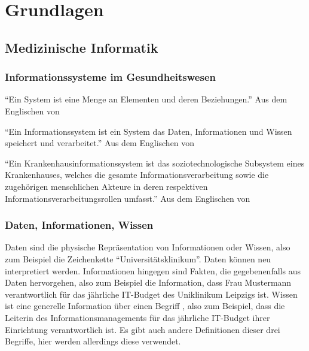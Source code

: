 \chapter{Grundlagen}\label{ch:preliminaries}

\section{Medizinische Informatik}

\subsection{Informationssysteme im Gesundheitswesen}

\begin{definition}[System]
\enquote{Ein System ist eine Menge an Elementen und deren Beziehungen.}
Aus dem Englischen von \citet[S.~30]{bb}
\end{definition}
\begin{definition}[Informationssystem]
\enquote{Ein Informationssystem ist ein System das Daten, Informationen und Wissen speichert und verarbeitet.}
Aus dem Englischen von \citet[S.~30]{bb}
\end{definition}

\begin{definition}
\enquote{Ein Krankenhausinformationssystem ist das soziotechnologische Subsystem eines Krankenhauses, welches die gesamte Informationsverarbeitung sowie die zugehörigen menschlichen Akteure in deren respektiven Informationsverarbeitungsrollen umfasst.}
Aus dem Englischen von \citet[S.~37]{bb}
\end{definition}

\subsection{Daten, Informationen, Wissen}
Daten sind die physische Repräsentation von Informationen oder Wissen, also zum Beispiel die Zeichenkette \enquote{Universitätsklinikum}.
Daten können neu interpretiert werden.
Informationen hingegen sind Fakten, die gegebenenfalls aus Daten hervorgehen, also zum Beispiel die Information, dass Frau Mustermann verantwortlich für das jährliche IT-Budget des Uniklinikum Leipzigs ist.
Wissen ist eine generelle Information über einen Begriff \citep[S.~29]{bb}, also zum Beispiel, dass die Leiterin des Informationsmanagements für das jährliche IT-Budget ihrer Einrichtung verantwortlich ist.
Es gibt auch andere Definitionen dieser drei Begriffe, hier werden allerdings diese verwendet.

